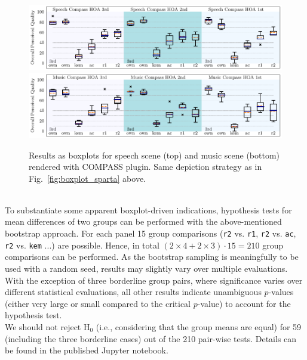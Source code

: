 \documentclass[conference]{IEEEtran}
\def\NewL{\\\noindent\hspace*{5mm}}
\begin{document}
\begin{figure}[h!]
\begin{center}
\includegraphics[width=1\textwidth]{../graphics/speech_compass_aes154.pdf}
\includegraphics[width=1\textwidth]{../graphics/music_compass_aes154.pdf}
\caption{Results as boxplots for speech scene (top) and music scene (bottom) rendered with COMPASS plugin. Same depiction strategy as in Fig.~\ref{fig:boxplot_sparta} above.}
\label{fig:boxplot_compass}
\end{center}
\end{figure}
%
\NewL To substantiate some apparent boxplot-driven indications, hypothesis tests for mean differences of two groups can be performed with the above-mentioned bootstrap approach.
%
For each panel 15 group comparisons (\texttt{r2} vs. \texttt{r1}, \texttt{r2} vs. \texttt{ac}, \texttt{r2} vs. \texttt{kem} ...) are possible.
%
Hence, in total $(2 \times 4 + 2 \times 3) \cdot 15 = 210$ group comparisons can be performed.
%
As the bootstrap sampling is meaningfully to be used with a random seed, results may slightly vary over multiple evaluations.
%
With the exception of three borderline group pairs, where significance varies over different statistical evaluations, all other results indicate unambiguous $p$-values (either very large or small compared to the critical $p$-value) to account for the hypothesis test.
%
\NewL We should not reject H$_0$ (i.e., considering that the group means are equal) for 59 (including the three borderline cases) out of the 210 pair-wise tests. Details can be found in the published Jupyter notebook.
\end{document}
